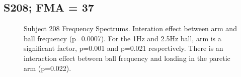 \documentclass{article}
\begin{document}
\clearpage
\subsection{S208; FMA = 37}

\begin{figure}[!ht]
     \centering
     \hfill
     \hfill
	\caption{Subject 208 Frequency Spectrums. Interation effect between arm and ball frequency (p=0.0007). For the 1Hz and 2.5Hz ball, arm is a significant factor, p=0.001 and p=0.021 respectively. There is an interaction effect between ball frequency and loading in the paretic arm (p=0.022).}
\end{figure}
\end{document}
